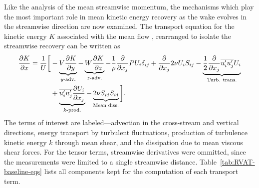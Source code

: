 Like the analysis of the mean streamwise momentum, the mechanisms which play the
most important role in mean kinetic energy recovery as the wake evolves in the
streamwise direction are now examined. The transport equation for the kinetic
energy $K$ associated with the mean flow \cite{TennekesAndLumley}, rearranged to
isolate the streamwise recovery can be written as
\begin{equation}
    \begin{split}
        \frac{\partial K}{\partial x}
        =
        \frac{1}{U}
        \bigg{[}
        & - \underbrace{V \frac{\partial K}{\partial y}}_{y\text{-adv.}}
        - \underbrace{W \frac{\partial K}{\partial z}}_{z\text{-adv.}}
        - \frac{1}{\rho}\frac{\partial}{\partial x_j} P U_i \delta_{ij}
        + \frac{\partial}{\partial x_j} 2 \nu U_i S_{ij}
        - \underbrace{
            \frac{1}{2}\frac{\partial}{\partial x_j} \overline{u_i' u_j'} U_i
        }_{\text{Turb. trans.}} \\
        & + 
        \underbrace{
            \overline{u_i' u_j'} \frac{\partial U_i}{\partial x_j}
        }_{k\text{-prod.}}
        - 
        \underbrace{
            2 \nu S_{ij}S_{ij}
        }_{\text{Mean diss.}}
        \bigg{]}.
    \label{eq-K_full}
    \end{split}
\end{equation}
The terms of interest are labeled---advection in the cross-stream and vertical
directions, energy transport by turbulent fluctuations, production of turbulence
kinetic energy $k$ through mean shear, and the dissipation due to mean viscous
shear forces. For the tensor terms, streamwise derivatives were ommitted, since
the measurements were limited to a single streamwise distance.
Table~\ref{tab:RVAT-baseline-eqs} lists all components kept for the computation
of each transport term.


